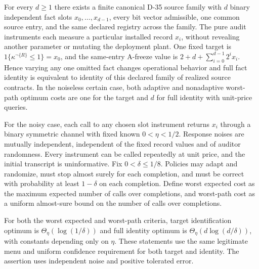\begin{theorem}\label{ext:m023}

For every \(d\ge1\) there exists a finite canonical D-35 source family with \(d\) binary independent fact slots \(x_0,\dots,x_{d-1}\), every bit vector admissible, one common source entry, and the same declared registry across the family. The pure audit instruments each measure a particular installed record \(x_i\), without revealing another parameter or mutating the deployment plant. One fixed target is \(1\{\kappa^{\neg\{R\}}\le1\}=x_0\), and the same-entry A-freeze value is \(2+d+\sum_{i=0}^{d-1}2^i x_i\). Hence varying any one omitted fact changes operational behavior and full fact identity is equivalent to identity of this declared family of realized source contracts. In the noiseless certain case, both adaptive and nonadaptive worst-path optimum costs are one for the target and \(d\) for full identity with unit-price queries.

For the noisy case, each call to any chosen slot instrument returns \(x_i\) through a binary symmetric channel with fixed known \(0<\eta<1/2\). Response noises are mutually independent, independent of the fixed record values and of auditor randomness. Every instrument can be called repeatedly at unit price, and the initial transcript is uninformative. Fix \(0<\delta\le1/8\). Policies may adapt and randomize, must stop almost surely for each completion, and must be correct with probability at least \(1-\delta\) on each completion. Define worst expected cost as the maximum expected number of calls over completions, and worst-path cost as a uniform almost-sure bound on the number of calls over completions.

For both the worst expected and worst-path criteria, target identification optimum is \(\Theta_\eta(\log(1/\delta))\) and full identity optimum is \(\Theta_\eta(d\log(d/\delta))\), with constants depending only on \(\eta\). These statements use the same legitimate menu and uniform confidence requirement for both target and identity. The assertion uses independent noise and positive tolerated error.

\end{theorem}

